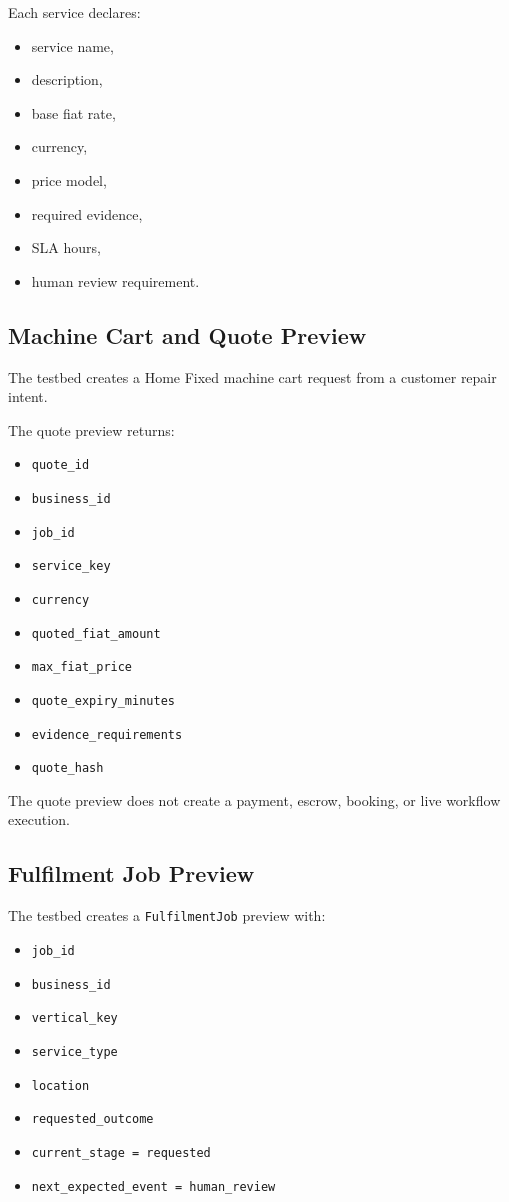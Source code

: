 Each service declares:

\begin{itemize}
  \item service name,
  \item description,
  \item base fiat rate,
  \item currency,
  \item price model,
  \item required evidence,
  \item SLA hours,
  \item human review requirement.
\end{itemize}

\subsection{Machine Cart and Quote Preview}

The testbed creates a Home Fixed machine cart request from a customer repair intent.

The quote preview returns:

\begin{itemize}
  \item \texttt{quote\_id}
  \item \texttt{business\_id}
  \item \texttt{job\_id}
  \item \texttt{service\_key}
  \item \texttt{currency}
  \item \texttt{quoted\_fiat\_amount}
  \item \texttt{max\_fiat\_price}
  \item \texttt{quote\_expiry\_minutes}
  \item \texttt{evidence\_requirements}
  \item \texttt{quote\_hash}
\end{itemize}

The quote preview does not create a payment, escrow, booking, or live workflow execution.

\subsection{Fulfilment Job Preview}

The testbed creates a \texttt{FulfilmentJob} preview with:

\begin{itemize}
  \item \texttt{job\_id}
  \item \texttt{business\_id}
  \item \texttt{vertical\_key}
  \item \texttt{service\_type}
  \item \texttt{location}
  \item \texttt{requested\_outcome}
  \item \texttt{current\_stage = requested}
  \item \texttt{next\_expected\_event = human\_review}
\end{itemize}

